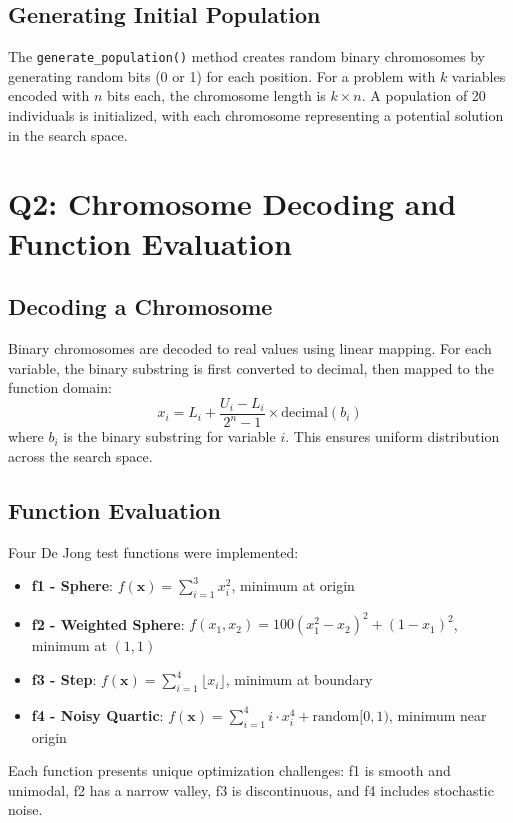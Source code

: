 \documentclass[journal,12pt,onecolumn]{IEEEtran}
\begin{document}
\subsection{Generating Initial Population}
The \texttt{generate\_population()} method creates random binary chromosomes by generating random bits (0 or 1) for each position. For a problem with $k$ variables encoded with $n$ bits each, the chromosome length is $k \times n$. A population of 20 individuals is initialized, with each chromosome representing a potential solution in the search space.

\section{Q2: Chromosome Decoding and Function Evaluation}

\subsection{Decoding a Chromosome}
Binary chromosomes are decoded to real values using linear mapping. For each variable, the binary substring is first converted to decimal, then mapped to the function domain:
\begin{equation}
x_i = L_i + \frac{U_i - L_i}{2^n - 1} \times \text{decimal}(b_i)
\end{equation}
where $b_i$ is the binary substring for variable $i$. This ensures uniform distribution across the search space.

\subsection{Function Evaluation}
Four De Jong test functions were implemented:
\begin{itemize}
    \item \textbf{f1 - Sphere}: $f(\mathbf{x}) = \sum_{i=1}^{3} x_i^2$, minimum at origin
    \item \textbf{f2 - Weighted Sphere}: $f(x_1,x_2) = 100(x_1^2 - x_2)^2 + (1 - x_1)^2$, minimum at $(1,1)$
    \item \textbf{f3 - Step}: $f(\mathbf{x}) = \sum_{i=1}^{4} \lfloor x_i \rfloor$, minimum at boundary
    \item \textbf{f4 - Noisy Quartic}: $f(\mathbf{x}) = \sum_{i=1}^{4} i \cdot x_i^4 + \text{random}[0,1)$, minimum near origin
\end{itemize}
Each function presents unique optimization challenges: f1 is smooth and unimodal, f2 has a narrow valley, f3 is discontinuous, and f4 includes stochastic noise.
\end{document}
